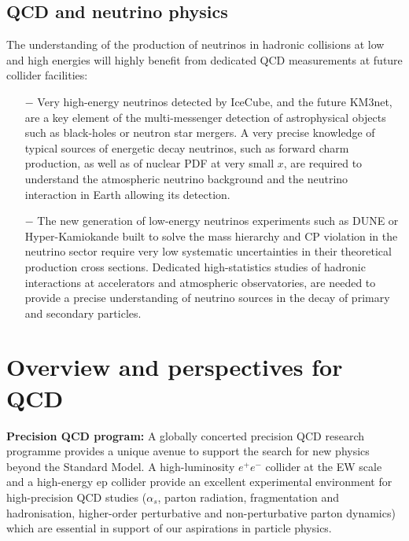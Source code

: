 \subsection{QCD and neutrino physics}
The understanding of the production of neutrinos in hadronic collisions at low and high energies will  highly benefit from dedicated QCD measurements at future collider facilities:
\begin{itemize}
\item [$-$] Very high-energy neutrinos detected by IceCube, and the future KM3net, are a key element of the multi-messenger detection of astrophysical objects such as black-holes or neutron star mergers. A very precise knowledge of typical sources of energetic decay neutrinos, such as forward charm production, as well as of nuclear PDF at very small $x$, are required to understand the atmospheric neutrino background and the neutrino interaction in Earth allowing its detection.
\item [$-$] The new generation of low-energy neutrinos experiments such as DUNE or Hyper-\-Kamiokande built to solve the mass hierarchy and CP violation in the neutrino sector require very low systematic uncertainties in their theoretical production cross sections. Dedicated high-statistics studies of  hadronic interactions at accelerators and atmospheric observatories, are needed to provide a precise understanding of neutrino sources in the decay of primary and secondary particles.
\end{itemize}

\noindent\section{Overview and perspectives for  QCD}
\vskip 0.3cm

\noindent\textbf{Precision QCD program:} 
A globally concerted precision QCD research programme provides
 a unique avenue to support the search
for new physics
beyond the Standard Model.  A high-luminosity $e^+e^-$
collider at the EW scale and a high-energy ep
collider provide an excellent experimental  environment for high-precision QCD studies ($\alpha_s$, parton radiation, fragmentation and
hadronisation, higher-order  perturbative and  non-perturbative parton dynamics) which are essential in support of  our aspirations in particle physics.
\\

